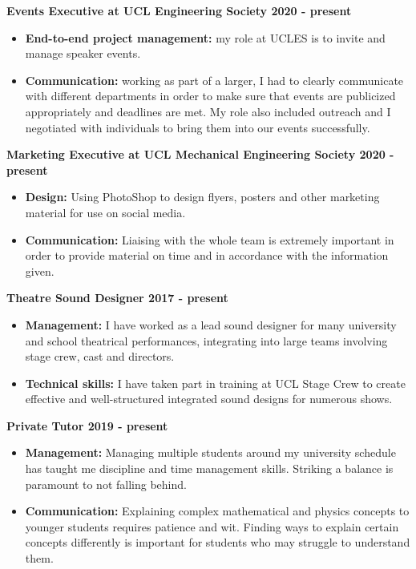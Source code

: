 \documentclass[margin, 10pt]{res} %
\begin{document}
\begin{resume}
\textbf{Events Executive at UCL Engineering Society \hfill 2020 - present}
\\
\begin{itemize}
  \item \textbf{End-to-end project management:} my role at UCLES is to invite and manage speaker events. 
  \item \textbf{Communication:} working as part of a larger, I had to clearly communicate with different departments in order to make sure that events are publicized appropriately and deadlines are met. My role also included outreach and I negotiated with individuals to bring them into our events successfully.
\end{itemize}

\textbf{Marketing Executive at UCL Mechanical Engineering Society \hfill 2020 - present}
\\
\begin{itemize}
  \item \textbf{Design:} Using PhotoShop to design flyers, posters and other marketing material for use on social media. 
  \item \textbf{Communication:} Liaising with the whole team is extremely important in order to provide material on time and in accordance with the information given.
\end{itemize}

\textbf{Theatre Sound Designer \hfill 2017 - present}
\\
\begin{itemize}
  \item \textbf{Management:} I have worked as a lead sound designer for many university and school theatrical performances, integrating into large teams involving stage crew, cast and directors.
  \item \textbf{Technical skills:} I have taken part in training at UCL Stage Crew to create effective and well-structured integrated sound designs for numerous shows.
\end{itemize}

\textbf{Private Tutor \hfill 2019 - present}
\\
\begin{itemize}
  \item \textbf{Management:} Managing multiple students around my university schedule has taught me discipline and time management skills. Striking a balance is paramount to not falling behind. 
  \item \textbf{Communication:} Explaining complex mathematical and physics concepts to \\ younger students requires patience and wit. Finding ways to explain certain concepts differently is important for students who may struggle to understand them.
\end{itemize}


\end{resume}
\end{document}
